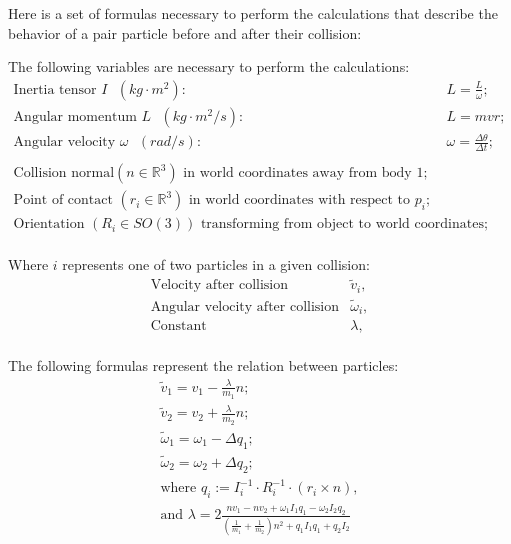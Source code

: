 \documentclass[a4paper,12pt]{report}
\begin{document}
Here is a set of formulas necessary to perform the calculations that describe
the behavior of a pair particle before and after their collision:

The following variables are necessary to perform the calculations:
\[
\begin{array}{ll}
    \text{Inertia tensor $I$ } (kg\cdot m^2): & L = \frac{L}{\omega}; \\
    \text{Angular momentum $L$ } (kg\cdot m^2/s): & L = mvr; \\
    \text{Angular velocity $\omega$ } (rad/s): & \omega = \frac{\Delta \theta}{\Delta t}; \\

	\\

	\text{Collision normal} (n \in \mathbb{R}^3) \text{ in world coordinates away from body 1}; \\
	\text{Point of contact } (r_i \in \mathbb{R}^3) \text{ in world coordinates with respect to $p_i$}; \\
	\text{Orientation } (R_i \in SO(3)) \text{ transforming from object to world coordinates}; \\
\end{array}
\]

Where $i$ represents one of two particles in a given collision:
\[
\begin{array}{ll}
	\text{Velocity after collision} & \tilde{v}_i, \\ 
	\text{Angular velocity after collision} & \tilde{\omega}_i, \\
	\text{Constant} & \lambda, \\
\end{array}
\]

The following formulas represent the relation between particles:
\[
\begin{array}{cc}
	\tilde{v}_1 = v_1 - \frac{\lambda}{m_1} n; \\ 
	\tilde{v}_2 = v_2 + \frac{\lambda}{m_2} n; \\
	\tilde{\omega}_1 = \omega_1 - \Delta q_1; \\
	\tilde{\omega}_2 = \omega_2 + \Delta q_2; \\

	\text{where } q_i := I_i^{-1} \cdot R_i^{-1} \cdot (r_i\times n), \\
	\text{and } \lambda = 2 \frac{n v_1 - n v_2 + \omega_1 I_1 q_1 - \omega_2 I_2 q_2}
	{(\frac{1}{m_1} + \frac{1}{m_2})n^2 + q_1 I_1 q_1 + q_2 I_2} \\
\end{array}
\]
\end{document}
